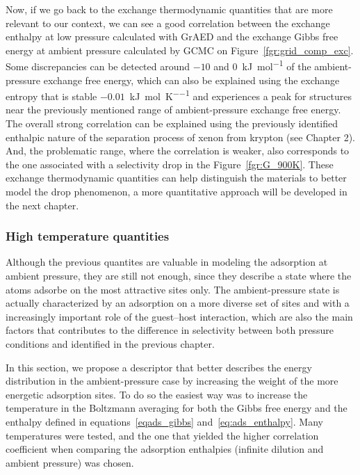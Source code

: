 \documentclass[main]{subfiles}
\begin{document}
Now, if we go back to the exchange thermodynamic quantities that are more relevant to our context, we can see a good correlation between the exchange enthalpy at low pressure calculated with GrAED and the exchange Gibbs free energy at ambient pressure calculated by GCMC on Figure~\ref{fgr:grid_comp_exc}. Some discrepancies can be detected around $-10$ and $0$~\si{\kilo\joule\per\mole} of the ambient-pressure exchange free energy, which can also be explained using the exchange entropy that is stable $-0.01$~\si{\kilo\joule\per\mole\per\kelvin} and experiences a peak for structures near the previously mentioned range of ambient-pressure exchange free energy. The overall strong correlation can be explained using the previously identified enthalpic nature of the separation process of xenon from krypton (see Chapter 2). And, the problematic range, where the correlation is weaker, also corresponds to the one associated with a selectivity drop in the Figure~\ref{fgr:G_900K}. These exchange thermodynamic quantities can help distinguish the materials to better model the drop phenomenon, a more quantitative approach will be developed in the next chapter.


\subsubsection{High temperature quantities}

Although the previous quantites are valuable in modeling the adsorption at ambient pressure, they are still not enough, since they describe a state where the atoms adsorbe on the most attractive sites only. The ambient-pressure state is actually characterized by an adsorption on a more diverse set of sites and with a increasingly important role of the guest--host interaction, which are also the main factors that contributes to the difference in selectivity between both pressure conditions and identified in the previous chapter.

In this section, we propose a descriptor that better describes the energy distribution in the ambient-pressure case by increasing the weight of the more energetic adsorption sites. To do so the easiest way was to increase the temperature in the Boltzmann averaging for both the Gibbs free energy and the enthalpy defined in equations~\ref{eqads_gibbs} and~\ref{eq:ads_enthalpy}. Many temperatures were tested, and the one that yielded the higher correlation coefficient when comparing the adsorption enthalpies (infinite dilution and ambient pressure) was chosen. 
\end{document}
